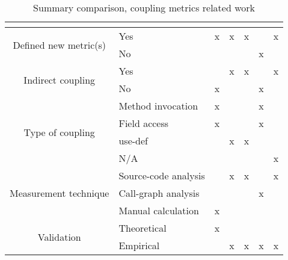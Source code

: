 \begin{table}[ht!]
\begin{center}

\begin{tabular}{|c|l|c|c|c|c|c|}
\hline
&  & \cite{Vernazza2000} & \cite{yang2005detecting} & \cite{Yang2010} & \cite{Allier2010} & \cite{Almugrin2016} \\ \hline\hline
\multirow{2}{*}{Defined new metric(s)} & Yes & x & x & x &  & x \\ \cline{2-7}
& No &  &  &  & x &  \\ \hline\hline
\multirow{2}{*}{Indirect coupling} & Yes &  & x & x &  & x \\ \cline{2-7}
& No & x &  &  & x &  \\ \hline\hline
\multirow{4}{*}{Type of coupling} & Method invocation & x &  &  & x &  \\ \cline{2-7}
& Field access & x &  &  & x &  \\ \cline{2-7}
& use-def &  & x & x &  &  \\ \cline{2-7}
& N/A &  &  &  &  & x \\ \hline\hline
\multirow{3}{*}{Measurement technique} & Source-code analysis &  & x & x &  & x \\ \cline{2-7}
& Call-graph analysis &  &  &  & x &  \\ \cline{2-7}
& Manual calculation & x &  &  &  &  \\ \hline\hline
\multirow{2}{*}{Validation} & Theoretical & x &  &  &  &  \\ \cline{2-7}
& Empirical &  & x & x & x & x \\ \hline
\end{tabular}

\end{center}
\caption{Summary comparison, coupling metrics related work}
\label{table:summary-coupling}
\end{table}
